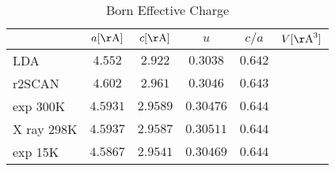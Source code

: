 \renewcommand{\arraystretch}{1.8}
\begin{table}[h]
 \caption{ Born Effective Charge}
 \label{table:SpeedOfLight}
 \centering
  \begin{tabular}{lccccc}
   \hline\hline
       & $a[\mathrm{\AA}]$ & $c[\mathrm{\AA}]$ & $u$ & $c/a$ & $V[\mathrm{\AA}^3]$ \\
   \hline 
    LDA        & $4.552$  & $2.922$  & $0.3038$  & $0.642$   & \\
    r2SCAN     & $4.602$  & $2.961$  & $0.3046$  & $0.643$   & \\ 
    exp 300K   & $4.5931$ & $2.9589$ & $0.30476$ & $0.644$   & \\ 
    X ray 298K & $4.5937$ & $2.9587$ & $0.30511$ & $0.644$   & \\ 
    exp 15K    & $4.5867$ & $2.9541$ & $0.30469$ & $0.644$   & \\ 
    \hline
   \hline
  \end{tabular}
\end{table}
\renewcommand{\arraystretch}{1}
